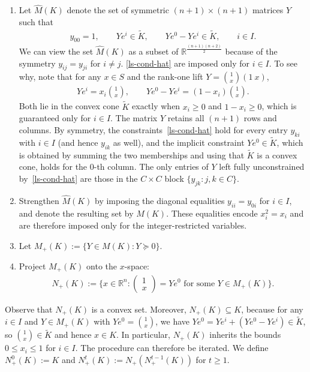\documentclass{article}
\newcommand{\R}{\mathbb{R}}
\begin{document}
\begin{enumerate}
    \item Let $\hat M(K)$ denote the set of symmetric $(n+1)\times(n+1)$ matrices $Y$ such that
    \begin{align}
        y_{00} = 1, \qquad Ye^i \in \tilde K, \qquad Ye^0 - Ye^i \in \tilde K, \qquad i \in I. \label{ls-cond-hat}
    \end{align}
    We can view the set $\hat M(K)$ as a subset of $\R^{\frac{(n+1)(n+2)}{2}}$ because of the symmetry $y_{ij} = y_{ji}$ for $i \not= j$. \eqref{ls-cond-hat} are imposed only for $i \in I$. To see why, note that for any $x \in S$ and the rank-one lift $Y = \binom{1}{x}(1 \ x)$,
    \begin{align}
        Ye^i = x_i\binom{1}{x}, \qquad Ye^0 - Ye^i = (1-x_i)\binom{1}{x}.
    \end{align}
    Both lie in the convex cone $\tilde K$ exactly when $x_i \geq 0$ and $1 - x_i \geq 0$, which is guaranteed only for $i \in I$. The matrix $Y$ retains all $(n+1)$ rows and columns. By symmetry, the constraints~\eqref{ls-cond-hat} hold for every entry $y_{ki}$ with $i \in I$ (and hence $y_{ik}$ as well), and the implicit constraint $Ye^0 \in \tilde K$, which is obtained by summing the two memberships and using that $\tilde K$ is a convex cone, holds for the $0$-th column. The only entries of $Y$ left fully unconstrained by~\eqref{ls-cond-hat} are those in the $C \times C$ block $\{y_{jk} : j,k \in C\}$.
    \item Strengthen $\hat M(K)$ by imposing the diagonal equalities $y_{ii} = y_{0i}$ for $i \in I$, and denote the resulting set by $M(K)$. These equalities encode $x_i^2 = x_i$ and are therefore imposed only for the integer-restricted variables.
    \item Let $M_+(K) := \{Y \in M(K) : Y \succeq 0\}$.
    \item Project $M_+(K)$ onto the $x$-space:
    \begin{align}
        N_+(K) := \big\{x \in \R^n : \begin{pmatrix} 1 \\ x \end{pmatrix} = Ye^0 \text{ for some } Y \in M_+(K)\big\}.
    \end{align}
\end{enumerate}

Observe that $N_+(K)$ is a convex set. Moreover, $N_+(K) \subseteq K$, because for any $i \in I$ and $Y \in M_+(K)$ with $Ye^0 = \binom{1}{x}$, we have $Ye^0 = Ye^i + (Ye^0 - Ye^i) \in \tilde K$, so $\binom{1}{x} \in \tilde K$ and hence $x \in K$. In particular, $N_+(K)$ inherits the bounds $0 \leq x_i \leq 1$ for $i \in I$. The procedure can therefore be iterated. We define $N_+^0(K) := K$ and $N_+^t(K) := N_+(N_+^{t-1}(K))$ for $t \geq 1$.
\end{document}
